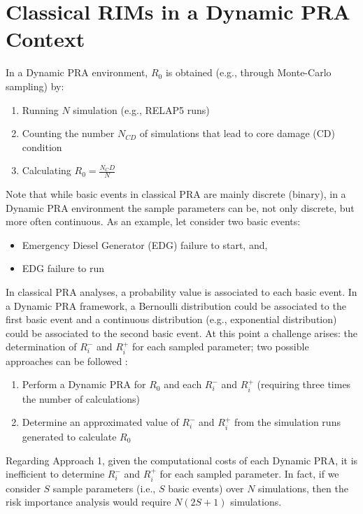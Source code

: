 \section{Classical RIMs in a Dynamic PRA Context}
\label{sec:classicalRIMs_RISMC}

In a Dynamic PRA environment, $R_0$ is obtained (e.g., through Monte-Carlo sampling) by:
\begin{enumerate}
  \item Running $N$ simulation (e.g., RELAP5 runs)
  \item Counting the number $N_{CD}$ of simulations that lead to core damage (CD) condition
  \item Calculating $R_0= \frac{N_CD}{N}$
\end{enumerate}
Note that while basic events in classical PRA are mainly discrete (binary), in a Dynamic PRA environment the 
sample parameters can be, not only discrete, but more often continuous. As an example, let consider
two basic events:
\begin{itemize}
  \item Emergency Diesel Generator (EDG) failure to start, and, 
  \item EDG failure to run
\end{itemize}

In classical PRA analyses, a probability value is associated to each basic event. 
In a Dynamic PRA framework, a Bernoulli distribution could be associated to the first basic event and 
a continuous distribution (e.g., exponential distribution) could be associated to the second basic event. 
At this point a challenge arises: the determination of $R_i^-$ and $R_i^+$ for each sampled parameter; 
two possible approaches can be followed :
\begin{enumerate}
  \item Perform a Dynamic PRA for $R_0$ and each $R_i^-$ and $R_i^+$ (requiring three times the number of calculations)
  \item Determine an approximated value of $R_i^-$ and $R_i^+$ from the simulation runs generated to calculate $R_0$
\end{enumerate}
Regarding Approach 1, given the computational costs of each Dynamic PRA, it is inefficient to determine 
$R_i^-$ and $R_i^+$ for each sampled parameter. In fact, if we consider $S$ sample
parameters (i.e., $S$ basic events) over $N$ simulations, then the risk importance analysis would require $N(2S+1)$ simulations.

